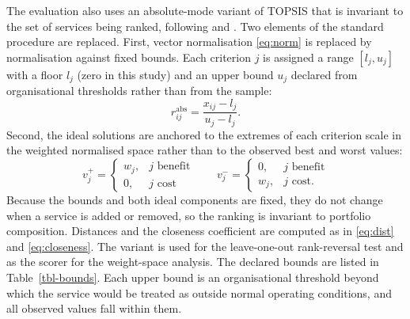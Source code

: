\documentclass[
  authoryear,
  preprint]{elsarticle}
\begin{document}
The evaluation also uses an absolute-mode variant of TOPSIS that is
invariant to the set of services being ranked, following
\citet{garcia-cascalesRankReversalTOPSIS2012} and
\citet{yangIngeniousSolutionRank2020}. Two elements of the standard
procedure are replaced. First, vector normalisation \eqref{eq:norm} is
replaced by normalisation against fixed bounds. Each criterion \(j\) is
assigned a range \([l_j, u_j]\) with a floor \(l_j\) (zero in this
study) and an upper bound \(u_j\) declared from organisational
thresholds rather than from the sample:
\begin{equation}\label{eq:absnorm}
r^{\text{abs}}_{ij} = \frac{x_{ij} - l_j}{u_j - l_j}.
\end{equation} Second, the ideal solutions are anchored to the extremes
of each criterion scale in the weighted normalised space rather than to
the observed best and worst values: \begin{equation}\label{eq:absideal}
v_j^{+} =
\begin{cases}
w_j, & j \text{ benefit} \\
0,   & j \text{ cost}
\end{cases}
\qquad
v_j^{-} =
\begin{cases}
0,   & j \text{ benefit} \\
w_j, & j \text{ cost.}
\end{cases}
\end{equation} Because the bounds and both ideal components are fixed,
they do not change when a service is added or removed, so the ranking is
invariant to portfolio composition. Distances and the closeness
coefficient are computed as in \eqref{eq:dist} and \eqref{eq:closeness}.
The variant is used for the leave-one-out rank-reversal test and as the
scorer for the weight-space analysis. The declared bounds are listed in
Table~\ref{tbl-bounds}. Each upper bound is an organisational threshold
beyond which the service would be treated as outside normal operating
conditions, and all observed values fall within them.
\end{document}
